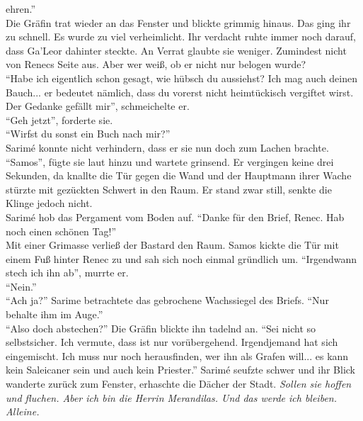 ehren.''\\
Die Gräfin trat wieder an das Fenster und blickte grimmig hinaus. Das ging ihr zu schnell. Es wurde 
zu viel verheimlicht. Ihr verdacht ruhte immer noch darauf, dass Ga'Leor dahinter steckte. An 
Verrat glaubte sie weniger. Zumindest nicht von Renecs Seite aus. Aber wer weiß, ob er nicht nur 
belogen wurde?\\
``Habe ich eigentlich schon gesagt, wie hübsch du aussiehst? Ich mag auch deinen Bauch... er 
bedeutet nämlich, dass du vorerst nicht heimtückisch vergiftet wirst. Der Gedanke gefällt mir'', 
schmeichelte er.\\
``Geh jetzt'', forderte sie.\\
``Wirfst du sonst ein Buch nach mir?''\\
Sarimé konnte nicht verhindern, dass er sie nun doch zum Lachen brachte. ``Samos'', fügte sie laut 
hinzu und wartete grinsend. Er vergingen keine drei Sekunden, da knallte die Tür gegen die Wand und 
der Hauptmann ihrer Wache stürzte mit gezückten Schwert in den Raum. Er stand zwar still, senkte die 
Klinge jedoch nicht.\\
Sarimé hob das Pergament vom Boden auf. ``Danke für den Brief, Renec. Hab noch einen schönen 
Tag!''\\
Mit einer Grimasse verließ der Bastard den Raum. Samos kickte die Tür mit einem Fuß hinter Renec zu 
und sah sich noch einmal gründlich um. 
``Irgendwann stech ich ihn ab'', murrte er.\\
``Nein.''\\
``Ach ja?''
Sarime betrachtete das gebrochene Wachssiegel des Briefs. ``Nur behalte ihm im Auge.''\\
``Also doch abstechen?''
Die Gräfin blickte ihn tadelnd an. ``Sei nicht so selbstsicher. Ich vermute, dass ist nur 
vorübergehend. Irgendjemand hat sich eingemischt.  Ich muss nur noch herausfinden, wer ihn als 
Grafen will... es kann kein Saleicaner sein und auch kein Priester.'' Sarimé seufzte schwer und ihr 
Blick wanderte zurück zum Fenster, erhaschte die Dächer der Stadt. \textit{Sollen sie hoffen und 
fluchen. Aber ich bin die Herrin Merandilas. Und das werde ich bleiben. Alleine.}

